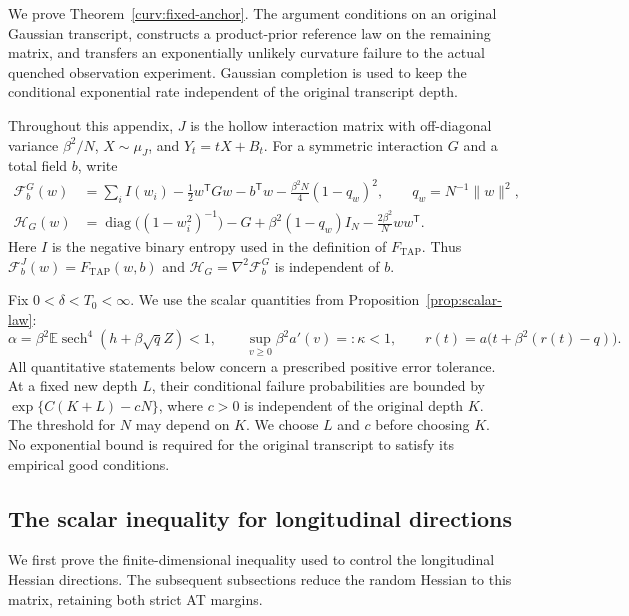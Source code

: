 \documentclass[11pt,reqno]{amsart}
\newcommand{\sech}{\operatorname{sech}}
\begin{document}
We prove Theorem~\ref{curv:fixed-anchor}. The argument conditions on an
original Gaussian transcript, constructs a product-prior reference law on
the remaining matrix, and transfers an exponentially unlikely curvature
failure to the actual quenched observation experiment. Gaussian completion
is used to keep the conditional exponential rate independent of the
original transcript depth.

Throughout this appendix, $J$ is the hollow interaction matrix with
off-diagonal variance $\beta^2/N$, $X\sim\mu_J$, and $Y_t=tX+B_t$.
For a symmetric interaction $G$ and a total field $b$, write
\begin{align}
 \mathcal F_b^G(w)
 &=\sum_i I(w_i)-\frac12w^{\mathsf T}Gw-b^{\mathsf T}w
       -\frac{\beta^2N}{4}(1-q_w)^2,
 \qquad q_w=N^{-1}\|w\|^2,\label{curv:tap-functional}\\
 \mathcal H_G(w)
 &=\operatorname{diag}\bigl((1-w_i^2)^{-1}\bigr)-G
       +\beta^2(1-q_w)I_N-\frac{2\beta^2}{N}ww^{\mathsf T}.
 \label{curv:hessian}
\end{align}
Here $I$ is the negative binary entropy used in the definition of
$F_{\mathrm{TAP}}$. Thus
$\mathcal F_b^J(w)=F_{\mathrm{TAP}}(w,b)$ and
$\mathcal H_G=\nabla^2\mathcal F_b^G$ is independent of $b$.

Fix $0<\delta<T_0<\infty$. We use the scalar quantities from
Proposition~\ref{prop:scalar-law}:
\begin{equation}\label{curv:scalar-parameters}
 \alpha=\beta^2\mathbb E\sech^4(h+\beta\sqrt q Z)<1,
 \qquad \sup_{v\ge0}\beta^2a'(v)=:\kappa<1,
 \qquad r(t)=a\bigl(t+\beta^2(r(t)-q)\bigr).
\end{equation}
All quantitative statements below concern a prescribed positive error
tolerance. At a fixed new depth $L$, their conditional failure probabilities
are bounded by $\exp\{C(K+L)-cN\}$, where $c>0$ is independent of the
original depth $K$. The threshold for $N$ may depend on $K$.
We choose $L$ and $c$ before choosing $K$. No exponential bound is required
for the original transcript to satisfy its empirical good conditions.

\subsection{The scalar inequality for longitudinal directions}\label{sec:longitudinal}
We first prove the finite-dimensional inequality used to control the
longitudinal Hessian directions. The subsequent subsections reduce the
random Hessian to this matrix, retaining both strict AT margins.
\end{document}
